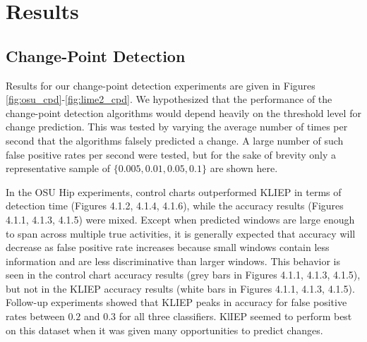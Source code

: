 \chapter{Results}
%

\section{Change-Point Detection}
\label{sec:cpd_results}

Results for our change-point detection experiments are given in
Figures \ref{fig:osu_cpd}-\ref{fig:lime2_cpd}.
We hypothesized that the performance of the change-point detection algorithms
would depend heavily on the threshold level for change prediction. This was
tested by varying the average number of times per second that the algorithms
falsely predicted a change. A large number of such false positive rates per
second were tested, but for the sake of brevity only a representative sample
of $\{0.005, 0.01, 0.05, 0.1\}$ are shown here.

In the OSU Hip experiments, control charts outperformed KLIEP in terms of
detection time (Figures 4.1.2, 4.1.4, 4.1.6), while the accuracy results 
(Figures 4.1.1, 4.1.3, 4.1.5) were
mixed. Except when predicted windows are large enough to span across multiple
true activities, it is generally expected that accuracy will decrease as false
positive rate increases because small windows contain less information and are
less discriminative than larger windows. This behavior is seen in the control chart
accuracy results (grey bars in Figures 4.1.1, 4.1.3, 4.1.5), but not in the
KLIEP accuracy results (white bars in Figures 4.1.1, 4.1.3, 4.1.5).
Follow-up experiments showed that KLIEP peaks in accuracy for
false positive rates between $0.2$ and $0.3$ for all three classifiers.
KlIEP seemed to perform best on this dataset when it was given many
opportunities to predict changes.

